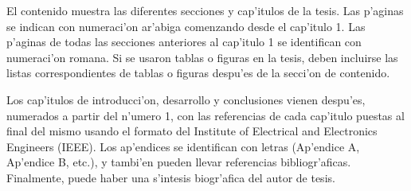 El contenido muestra las diferentes secciones y cap'itulos de la tesis. Las p'aginas se indican con numeraci'on ar'abiga comenzando desde el cap'itulo 1. Las p'aginas de todas las secciones anteriores al cap'itulo 1 se identifican con numeraci'on romana. Si se usaron tablas o figuras en la tesis, deben incluirse las listas correspondientes de tablas o figuras despu'es de la secci'on de contenido.

Los cap'itulos de introducci'on, desarrollo y conclusiones vienen despu'es, numerados a partir del n'umero 1, con las referencias de cada cap'itulo puestas al final del mismo usando el formato del Institute of Electrical and Electronics Engineers (IEEE). Los ap'endices se identifican con letras (Ap'endice A, Ap'endice B, etc.), y tambi'en pueden llevar referencias bibliogr'aficas. Finalmente, puede haber una s'intesis biogr'afica del autor de tesis.
\clearpage